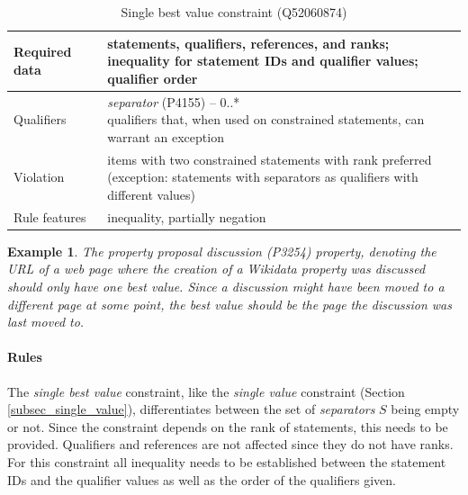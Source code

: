 \documentclass[hyperref,bachelorofscience,fleqn]{cgvpub}
\newtheorem{example}{Example}
\begin{document}
\begin{table}[H]
\caption{Single best value constraint (Q52060874)}
\begin{tabularx}{\textwidth}{ ll X}
\hline
Required data & \makecell{statements, qualifiers, references, and ranks; \\
inequality for statement IDs and qualifier values; \\
qualifier order} \\
\hline
Qualifiers & \makecell{\emph{separator} (P4155) -- 0..* \\ qualifiers that, when used on constrained statements, can warrant an exception } \\
\hline
Violation & \makecell{items with two constrained statements with rank preferred \\ (exception: statements with separators as qualifiers with different values)} \\
\hline
Rule features & inequality, partially negation \\
\hline
\end{tabularx}
\end{table}

\begin{example}
The \emph{property proposal discussion} (P3254) property, denoting the URL of a web page where the creation of a Wikidata property was discussed should only have one best value. Since a discussion might have been moved to a different page at some point, the best value should be the page the discussion was last moved to.
\end{example}

\paragraph{Rules}
The \emph{single best value} constraint, like the \emph{single value} constraint (Section \ref{subsec_single_value}), differentiates between the set of \emph{separators} \(S\) being empty or not. Since the constraint depends on the rank of statements, this needs to be provided. Qualifiers and references are not affected since they do not have ranks. For this constraint all inequality needs to be established between the statement IDs and the qualifier values as well as the order of the qualifiers given.\\
\end{document}
